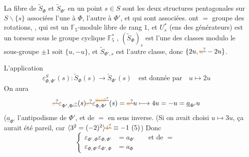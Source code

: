  La fibre de $\widetilde S_\Phi$ et $\widetilde S_{\Phi'}$ en un point $s\in S$ sont les
deux  structures pentagonales sur $S\smallsetminus\{s\}$ associées
 l'une à $\Phi$, l'autre à $\Phi'$, et qui sont associées. 
ont $=$ groupe des rotations, ,  qui
est un  $\mathbb F_5$-module libre de rang $1$,
et $U_s^*$ (ens des générateurs) est un torseur sous le groupe cyclique
$\mathbb F_5^*$ , 
$(\widetilde S_\Phi)_s$ est l'une des classes modulo le sous-groupe $\pm1$
soit $\{u,-u\}$, et $\widetilde S_{\Phi',s}$ est l'autre classe, donc
$\{2u,\deleted{\unsure{u}}-2u\}$.

L'application
\[
\varepsilon^S_{\Phi,\Phi'}(s):\widetilde S_\Phi(s)\longrightarrow\widetilde S_{\Phi'}(s)
\quad\text{est donnée par}\quad
u\longmapsto 2u
\]
On aura
\[
\deleted{\unsure{\varepsilon}}\varepsilon_{\Phi',\Phi\deleted{\unsure{'}}}(s)
\deleted{\unsure{\varepsilon}}\varepsilon^{\deleted{\unsure{2a|S}}}_{\Phi,\Phi'}(s)
=\deleted{\unsure{a}}u\longmapsto4u=-u=\underline a_{\Phi'}u
\]
($\underline a_{\Phi'}$ l'antipodisme de $\Phi'$,
et de $=$ en sens inverse. (Si on avait choisi
$u\mapsto3u$, ça aurait été pareil, car
$\inserted{3^2=(-2)^2}\deleted{\unsure{4}}\equiv-1\ (5)$)
 Donc
\[
\left\{\begin{aligned}
\varepsilon_{\Phi',\Phi}\varepsilon_{\Phi,\Phi'}&=a_{\Phi'}\qquad\text{et de }=\\
\varepsilon_{\Phi,\Phi'}\varepsilon_{\Phi',\Phi}&=a_\Phi
\end{aligned}\right.
\tag*{(1)}
\]

